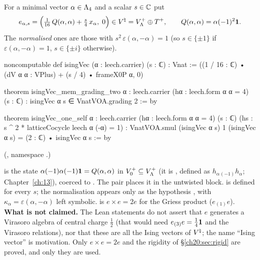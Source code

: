 \begin{definition}\label{ch20:def:ising}
For a minimal vector $\alpha\in{\Lambda}_4$ and a scalar $s\in{\mathbb{C}}$ put
\begin{equation}\label{ch20:eq:ising}
  e_{\alpha,s}=\Bigl(\tfrac1{16}\,Q(\alpha,\alpha)+\tfrac s4\,x_\alpha,\;0\Bigr)\in{V^{\natural}}=V_{\Lambda}^{+}\oplus T^{+},
  \qquad Q(\alpha,\alpha)=\alpha(-1)^2\mathbf 1 .
\end{equation}
The \emph{normalised} ones are those with $s^2\,\varepsilon(\alpha,-\alpha)=1$ (so $s\in\{\pm1\}$ if
$\varepsilon(\alpha,-\alpha)=1$, $s\in\{\pm i\}$ otherwise).
\end{definition}
\begin{leancode}
noncomputable def isingVec (α : leech.carrier) (s : ℂ) : Vnat :=
  ((1 / 16 : ℂ) • (dV α α : VPlus) + (s / 4) • frameX0P α, 0)

theorem isingVec_mem_grading_two {α : leech.carrier} (hα : leech.form α α = 4)
    (s : ℂ) : isingVec α s ∈ VnatVOA.grading 2 := by

theorem isingVec_one_self {α : leech.carrier} (hα : leech.form α α = 4) (s : ℂ)
    (hs : s ^ 2 * latticeCocycle leech α (-α) = 1) :
    VnatVOA.smul (isingVec α s) 1 (isingVec α s) = (2 : ℂ) • isingVec α s := by
\end{leancode}
(, namespace .)
\begin{dictionary}
 is the state $\alpha(-1)\alpha(-1)\mathbf 1=Q(\alpha,\alpha)$ in $V_0^+\subseteq V_{\Lambda}^{+}$ (it is
, defined as $h_\alpha{}_{(-1)}h_\alpha$; Chapter~\ref{ch:13}), coerced to .  The pair 
places it in the untwisted block.   is defined for every $s$; the normalisation appears only as the
hypothesis , with $\kappa_\alpha=\varepsilon(\alpha,-\alpha)$ left symbolic.   is $e\times e=2e$
for the Griess product ($e_{(1)}e$).  \textbf{What is not claimed.}  The Lean statements do not assert that $e$ generates a
Virasoro algebra of central charge $\tfrac12$ (that would need $e_{(3)}e=\tfrac14\mathbf 1$ and the Virasoro relations), nor
that these are all the Ising vectors of ${V^{\natural}}$; the name ``Ising vector'' is motivation.  Only $e\times e=2e$ and the
rigidity of \S\ref{ch20:sec:rigid} are proved, and only they are used.
\end{dictionary}
